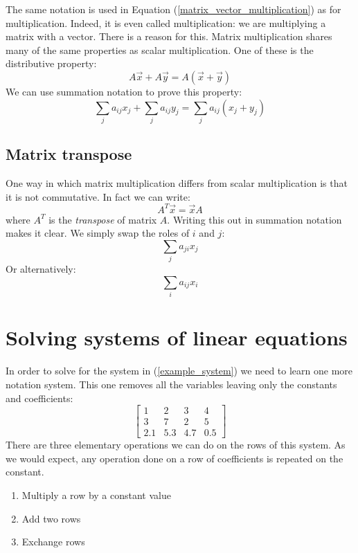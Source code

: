 \documentclass{article}
\begin{document}
The same notation is used in Equation (\ref{matrix_vector_multiplication})
as for multiplication.
Indeed, it is even called multiplication: we are multiplying a matrix with
a vector.
There is a reason for this.
Matrix multiplication shares many of the same properties as scalar multiplication.
One of these is the distributive property:
\begin{equation}
A \vec x + A \vec y = A (\vec x + \vec y)
\end{equation}
We can use summation notation to prove this property:
\begin{equation}
\sum_j a_{ij} x_j + \sum_j a_{ij} y_j = \sum_j a_{ij} (x_j + y_j)
\end{equation}

\subsection{Matrix transpose}

One way in which matrix multiplication differs from scalar multiplication
is that it is not commutative.
In fact we can write:
\begin{equation}
A^T \vec x = \vec x A
\end{equation}
where $A^T$ is the {\it transpose} of matrix $A$.
Writing this out in summation notation makes it clear.
We simply swap the roles of $i$ and $j$:
\begin{equation}
\sum_j a_{ji} x_j
\end{equation}
Or alternatively:
\begin{equation}
\sum_i a_{ij} x_i
\end{equation}

\section{Solving systems of linear equations}

\label{solving}

In order to solve for the system in (\ref{example_system}) we need to learn
one more notation system.
This one removes all the variables leaving only the constants and coefficients:
\begin{equation}
	\left [ \begin{array}{ccc|c}
			1 & 2 & 3 & 4 \\
			3 & 7 & 2 & 5 \\
			2.1 & 5.3 & 4.7 & 0.5
	\end{array} \right ]
\end{equation}
There are three elementary operations we can do on the rows of this system.
As we would expect,
any operation done on a row of coefficients is repeated on the constant.
\begin{enumerate}
	\item Multiply a row by a constant value
	\item Add two rows
	\item Exchange rows
\end{enumerate}
\end{document}
